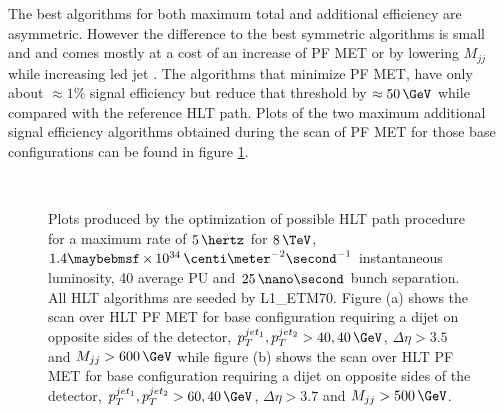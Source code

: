 The best algorithms for both maximum total and additional efficiency are asymmetric. However the difference to the best symmetric algorithms is small and and comes mostly at a cost of an increase of \gls{PF} \gls{MET} or by lowering $M_{jj}$ while increasing led jet \pt. The algorithms that minimize \gls{PF} \gls{MET}, have only about $\approx 1\%$ signal efficiency but reduce that threshold by $\approx 50\,\GeV$ while compared with the reference \gls{HLT} path. Plots of the two maximum additional signal efficiency algorithms obtained during the scan of \gls{PF} \gls{MET} for those base configurations can be found in figure \ref{FIGURE:RunIIPreparation_HLT_Seed_L1TETM70}.

\begin{figure}[!htp]%
\centering
{}\qquad
{}\\
\caption{Plots produced by the optimization of possible \gls{HLT} path procedure for a maximum rate of $5\,\hertz$ for $8\,\TeV$, $1.4 \times 10^{34}\,\centi\meter^{-2}\second^{-1}$ instantaneous luminosity, 40 average \gls{PU} and $25\,\nano\second$ bunch separation. All \gls{HLT} algorithms are seeded by L1\_ETM70. Figure (a) shows the scan over \gls{HLT} \gls{PF} \gls{MET} for base configuration requiring a dijet on opposite sides of the detector, $p_T^{jet_1},p_T^{jet_2}>40,40\,\GeV$, $\Delta\eta>3.5$ and $M_{jj}>600\,\GeV$ while figure (b) shows the scan over \gls{HLT} \gls{PF} \gls{MET} for base configuration requiring a dijet on opposite sides of the detector, $p_T^{jet_1},p_T^{jet_2}>60,40\,\GeV$, $\Delta\eta>3.7$ and $M_{jj}>500\,\GeV$.}
\label{FIGURE:RunIIPreparation_HLT_Seed_L1TETM70}
\end{figure}

